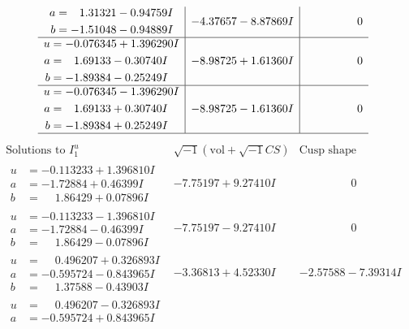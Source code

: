 \documentclass[1p]{elsarticle_modified}
\theoremstyle{definition}
\newcommand{\I}{\sqrt{-1}}
\begin{document}
$$\begin{array}{c|c|c}
\begin{aligned}
a &= \phantom{-}1.31321 - 0.94759 I \\
b &= -1.51048 - 0.94889 I\end{aligned}
 & -4.37657 - 8.87869 I & \phantom{-0.000000 } 0 \\ \hline\begin{aligned}
u &= -0.076345 + 1.396290 I \\
a &= \phantom{-}1.69133 - 0.30740 I \\
b &= -1.89384 - 0.25249 I\end{aligned}
 & -8.98725 + 1.61360 I & \phantom{-0.000000 } 0 \\ \hline\begin{aligned}
u &= -0.076345 - 1.396290 I \\
a &= \phantom{-}1.69133 + 0.30740 I \\
b &= -1.89384 + 0.25249 I\end{aligned}
 & -8.98725 - 1.61360 I & \phantom{-0.000000 } 0\\
 \hline 
 \end{array}$$\newpage$$\begin{array}{c|c|c}  
\text{Solutions to }I^u_{1}& \I (\text{vol} + \sqrt{-1}CS) & \text{Cusp shape}\\
 \hline 
\begin{aligned}
u &= -0.113233 + 1.396810 I \\
a &= -1.72884 + 0.46399 I \\
b &= \phantom{-}1.86429 + 0.07896 I\end{aligned}
 & -7.75197 + 9.27410 I & \phantom{-0.000000 } 0 \\ \hline\begin{aligned}
u &= -0.113233 - 1.396810 I \\
a &= -1.72884 - 0.46399 I \\
b &= \phantom{-}1.86429 - 0.07896 I\end{aligned}
 & -7.75197 - 9.27410 I & \phantom{-0.000000 } 0 \\ \hline\begin{aligned}
u &= \phantom{-}0.496207 + 0.326893 I \\
a &= -0.595724 - 0.843965 I \\
b &= \phantom{-}1.37588 - 0.43903 I\end{aligned}
 & -3.36813 + 4.52330 I & -2.57588 - 7.39314 I \\ \hline\begin{aligned}
u &= \phantom{-}0.496207 - 0.326893 I \\
a &= -0.595724 + 0.843965 I \\

\end{aligned}
\end{array}$$
\end{document}
